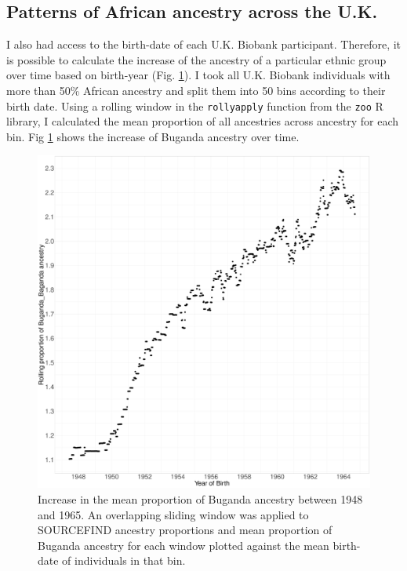 \subsection{Patterns of African ancestry across the U.K.}

I also had access to the birth-date of each U.K. Biobank participant. Therefore, it is possible to calculate the increase of the ancestry of a particular ethnic group over time based on birth-year (Fig.  \ref{fig:rollingaverage_time_Buganda_ancestry}). I took all U.K. Biobank individuals with more than 50\% African ancestry and split them into 50 bins according to their birth date. Using a rolling window in the \texttt{rollyapply} function from the \texttt{zoo} R library, I calculated the mean proportion of all ancestries across ancestry for each bin. Fig \ref{fig:rollingaverage_time_Buganda_ancestry} shows the increase of Buganda ancestry over time. 

\begin{figure}[htp]
    \centering
    \includegraphics[width=1.0\textwidth]{../images/chapter3/rollingaverage_time_Buganda_ancestry.pdf}
    \caption{Increase in the mean proportion of Buganda ancestry between 1948 and 1965. An overlapping sliding window was applied to SOURCEFIND ancestry proportions and mean proportion of Buganda ancestry for each window plotted against the mean birth-date of individuals in that bin.}
    \label{fig:rollingaverage_time_Buganda_ancestry}
\end{figure}

